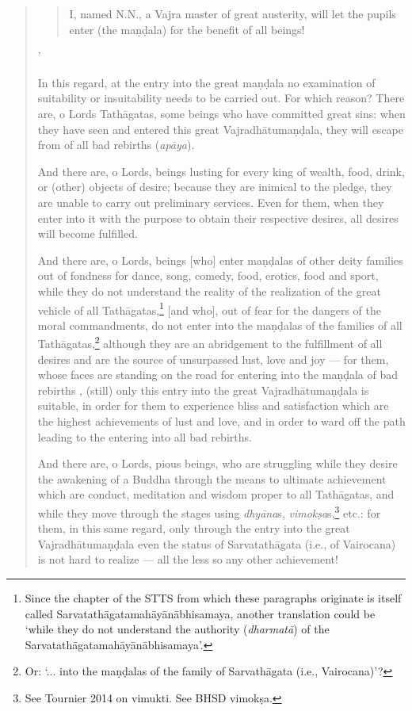 \documentclass[11pt]{book}
\newcommand{\skt}[1]{\emph{#1}}
\begin{document}
\begin{quote}
\begin{verse}
I, named N.N., a Vajra master of great austerity, will let the pupils enter (the maṇḍala) for the benefit of all beings!
\end{verse}'

In this regard, at the entry into the great maṇḍala no examination of suitability or insuitability needs to be carried out. For which reason? There are, o Lords Tathāgatas, some beings who have committed great sins: when they have seen and entered this great Vajradhātumaṇḍala, they will escape from of all bad rebirths (\emph{apāya}).

And there are, o Lords, beings lusting for every king of wealth, food, drink, or (other) objects of desire; because they are inimical to the pledge, they are unable to carry out preliminary services. Even for them, when they enter into it with the purpose to obtain their respective desires, all desires will become fulfilled.

And there are, o Lords, beings	 [who] enter maṇḍalas of other deity families out of fondness for dance, song, comedy, food, erotics, food and sport, while they do not understand the reality of the realization of the great vehicle of all Tathāgatas,\footnote{Since the chapter of the STTS from which these paragraphs originate is itself called Sarvatathāgatamahāyānābhisamaya, another translation could be `while they do not understand the authority (\emph{dharmatā}) of the Sarvatathāgatamahāyānābhisamaya'.} [and who], out of fear for the dangers of the moral commandments, do not enter into the maṇḍalas of the families of all Tathāgatas,\footnote{Or: `... into the maṇḍalas of the family of Sarvathāgata (i.e., Vairocana)'?} although they are an abridgement to the fulfillment of all desires and are the source of unsurpassed lust, love and joy —  for them, 
	whose faces are standing on the road for entering into the maṇḍala of bad rebirths%
	, (still) only this entry into the great Vajradhātumaṇḍala is suitable, in order for them to experience bliss and satisfaction which are the highest achievements of lust and love, and in order to ward off the path leading to the entering into all bad rebirths.

And there are, o Lords, pious beings, who are struggling while they desire the awakening of a Buddha through the means to ultimate achievement which are conduct, meditation and wisdom proper to all Tathāgatas, and while they move through the stages using \emph{dhyāna}s, \skt{vimokṣa}s,\footnote{See Tournier 2014 on vimukti. See BHSD vimokṣa.} etc.: for them, in this same regard,
  only through the entry into the great Vajradhātumaṇḍala even the status of Sarvatathāgata (i.e., of Vairocana) is not hard to realize — all the less so any other achievement!
\end{quote}
\end{document}
